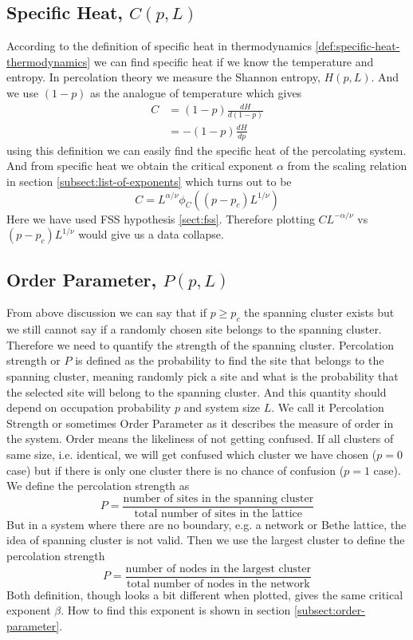 	\subsection{Specific Heat, $C(p,L)$}
	According to the definition of specific heat in thermodynamics \ref{def:specific-heat-thermodynamics}  we can find specific heat if we know the temperature and entropy. In percolation theory we measure the Shannon entropy, $H(p,L)$. And we use $(1-p)$ as the analogue of temperature which gives
	\begin{align}
		C &= (1-p) \frac{dH}{d(1-p)} \\
		  &= -(1-p) \frac{dH}{dp}
		  \label{def:specific-heat-percolation}
	\end{align}
	using this definition we can easily find the specific heat of the percolating system. And from specific heat we obtain the critical exponent $\alpha$ from the scaling relation in section \ref{subsect:list-of-exponents} which turns out to be
	\begin{equation}
		C = L^{\alpha/\nu} \phi_C(\left(p-p_c\right)L^{1/\nu})
	\end{equation}
	Here we have used FSS hypothesis \ref{sect:fss}.
	Therefore plotting $C L^{-\alpha/\nu}$ vs $\left(p-p_c\right)L^{1/\nu}$ would give us a data collapse.
			
	
	\subsection{Order Parameter, $P(p,L)$}
		From above discussion we can say that if $p\geq p_c$ the spanning cluster exists but we still cannot say if a randomly chosen site belongs to the spanning cluster. Therefore we need to quantify the strength of the spanning cluster. Percolation strength or $P$ is defined as the probability to find the site that belongs to the spanning cluster, meaning randomly pick a site and what is the probability that the selected site will belong to the spanning cluster. And this quantity should depend on occupation probability $p$ and system size $L$. We call it Percolation Strength or sometimes Order Parameter as it describes the measure of order in the system. Order means the likeliness of not getting confused. If all clusters of same size, i.e. identical, we will get confused which cluster we have chosen ($p=0$ case) but if there is only one cluster there is no chance of confusion ($p=1$ case).\\
		We define the percolation strength as
		\begin{equation}
			P = \frac{\text{number of sites in the spanning cluster}}{\text{total number of sites in the lattice}}
		\end{equation}
		But in a system where there are no boundary, e.g. a network or Bethe lattice, the idea of spanning cluster is not valid. Then we use the largest cluster to define the percolation strength
		\begin{equation}
			P = \frac{\text{number of nodes in the largest cluster}}{\text{total number of nodes in the network}}
		\end{equation}
		Both definition, though looks a bit different when plotted, gives the same critical exponent $\beta$. How to find this exponent is shown in section \ref{subsect:order-parameter}.
		
